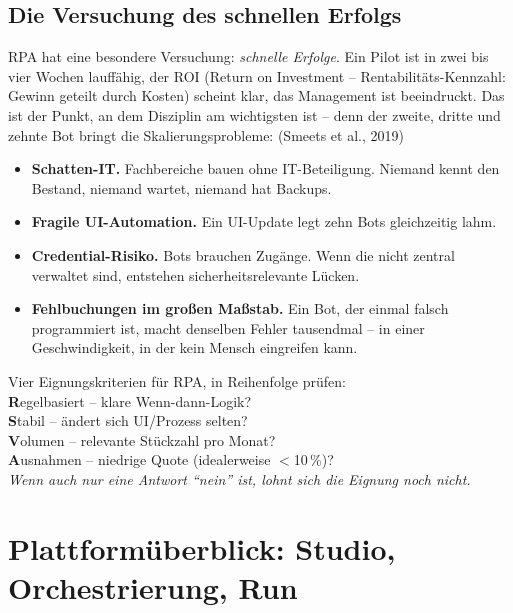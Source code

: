 \documentclass[11pt,a4paper,oneside]{article}
\newcommand{\caveatfontfallback}{\itshape}
\newcommand\caveatfont{\caveatfontfallback}%
\newcommand{\akzent}[1]{{\caveatfont\color{lpAmber}#1}}
\newcommand{\quelle}[1]{{\footnotesize\color{lpGray}(#1)}}
\begin{document}
\subsection{Die Versuchung des schnellen Erfolgs}

RPA hat eine besondere Versuchung: \emph{schnelle Erfolge}. Ein Pilot ist in zwei bis vier Wochen lauffähig, der ROI (Return on Investment -- Rentabilit\"ats-Kennzahl: Gewinn geteilt durch Kosten) scheint klar, das Management ist beeindruckt. Das ist der Punkt, an dem Disziplin am wichtigsten ist -- denn der zweite, dritte und zehnte Bot bringt die Skalierungsprobleme: \quelle{Smeets et al., 2019}

\begin{itemize}
  \item \textbf{Schatten-IT.} Fachbereiche bauen ohne IT-Beteiligung. Niemand kennt den Bestand, niemand wartet, niemand hat Backups.
  \item \textbf{Fragile UI-Automation.} Ein UI-Update legt zehn Bots gleichzeitig lahm.
  \item \textbf{Credential-Risiko.} Bots brauchen Zugänge. Wenn die nicht zentral verwaltet sind, entstehen sicherheitsrelevante Lücken.
  \item \textbf{Fehlbuchungen im großen Maßstab.} Ein Bot, der einmal falsch programmiert ist, macht denselben Fehler tausendmal -- in einer Geschwindigkeit, in der kein Mensch eingreifen kann.
\end{itemize}

\begin{eselsbox}[Eselsbrücke: \akzent{R-S-V-A}]
Vier Eignungskriterien für RPA, in Reihenfolge prüfen:\\[2pt]
\textbf{R}egelbasiert -- klare Wenn-dann-Logik?\\
\textbf{S}tabil -- ändert sich UI/Prozess selten?\\
\textbf{V}olumen -- relevante Stückzahl pro Monat?\\
\textbf{A}usnahmen -- niedrige Quote (idealerweise $<$10\,\%)?\\[2pt]
\emph{Wenn auch nur eine Antwort ``nein'' ist, lohnt sich die Eignung noch nicht.}
\end{eselsbox}

\section{Plattformüberblick: Studio, Orchestrierung, Run}
\end{document}
